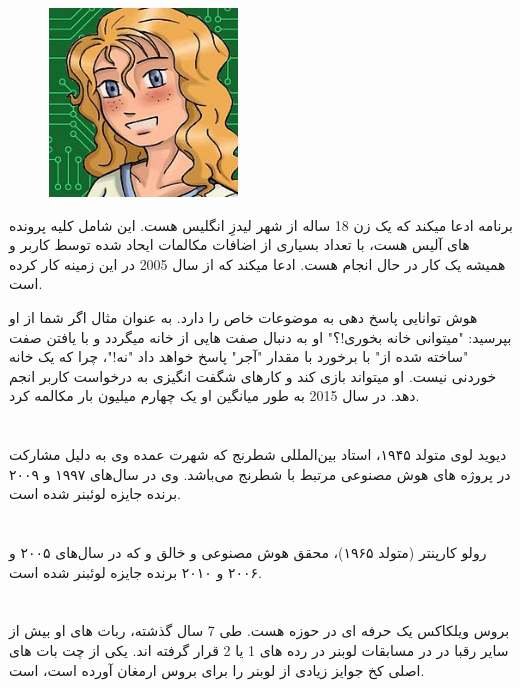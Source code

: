 \documentclass[18pt,a4paper]{report}
\begin{document}
\begin{figure}
	\begin{center}
		\includegraphics[width=5cm, height=5cm]{imgs/Mitsuku.jpg}
		\label{Mitsuku image}
		\caption{}
	\end{center}
\end{figure} 	
 	
 برنامه 	 ادعا میکند که یک زن 18 ساله از شهر لیدزِ انگلیس هست. این شامل کلیه پرونده های  آلیس هست، با تعداد بسیاری از اضافات مکالمات ایحاد شده توسط کاربر و همیشه یک کار در حال انجام هست.  ادعا میکند که از سال 2005 در این زمینه کار کرده است. 
  
 هوش  توانایی پاسخ دهی به موضوعات خاص را دارد. به عنوان مثال اگر شما از او بپرسید: "میتوانی خانه بخوری!؟" او به دنبال صفت هایی از خانه میگردد و با یافتن صفت "ساخته شده از" با برخورد با مقدار "آجر" پاسخ خواهد داد "نه!"، چرا که یک خانه خوردنی نیست. او میتواند بازی کند و کارهای شگفت انگیزی به درخواست کاربر انجم دهد. در سال 2015 به طور میانگین او یک چهارم میلیون بار مکالمه کرد. 
 


 \section{}
دیوید لوی متولد ۱۹۴۵، استاد بین‌المللی شطرنج که شهرت عمده وی به دلیل مشارکت در پروژه های هوش مصنوعی مرتبط با شطرنج می‌باشد.
وی در سال‌های ۱۹۹۷ و ۲۰۰۹ برنده جایزه لوئبنر شده است.	 

\section{}
رولو کارپنتر (متولد ۱۹۶۵)، محقق هوش مصنوعی و خالق  و  که در سال‌های ۲۰۰۵ و ۲۰۰۶ و ۲۰۱۰ برنده جایزه لوئبنر شده است.
 
 \section{}
 بروس ویلکاکس یک حرفه ای در حوزه  هست. طی 7 سال گذشته، ربات های او بیش از سایر رقبا در در مسابقات لوبنر در رده های 1 یا 2 قرار گرفته اند. یکی از چت بات های اصلی کخ جوایز زیادی از لوبنر را برای بروس ارمغان آورده است،  است.
 
\end{document}
